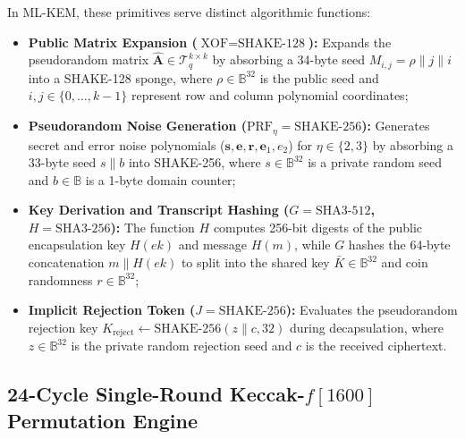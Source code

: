 In \mbox{ML-KEM}, these primitives serve distinct algorithmic functions:
\begin{itemize}
    \item \textbf{Public Matrix Expansion ($\text{XOF} = \text{SHAKE-128}$):} Expands the pseudorandom matrix $\hat{\mathbf{A}} \in \mathcal{T}_q^{k \times k}$ by absorbing a 34-byte seed $M_{i, j} = \rho \parallel j \parallel i$ into a SHAKE-128 sponge, where $\rho \in \mathbb{B}^{32}$ is the public seed and $i, j \in \{0, \dots, k-1\}$ represent row and column polynomial coordinates;
    \item \textbf{Pseudorandom Noise Generation ($\text{PRF}_\eta = \text{SHAKE-256}$):} Generates secret and error noise polynomials ($\mathbf{s}, \mathbf{e}, \mathbf{r}, \mathbf{e}_1, e_2$) for $\eta \in \{2, 3\}$ by absorbing a 33-byte seed $s \parallel b$ into SHAKE-256, where $s \in \mathbb{B}^{32}$ is a private random seed and $b \in \mathbb{B}$ is a 1-byte domain counter;
    \item \textbf{Key Derivation and Transcript Hashing ($G = \text{SHA3-512}$, $H = \text{SHA3-256}$):} The function $H$ computes 256-bit digests of the public encapsulation key $H(ek)$ and message $H(m)$, while $G$ hashes the 64-byte concatenation $m \parallel H(ek)$ to split into the shared key $\bar{K} \in \mathbb{B}^{32}$ and coin randomness $r \in \mathbb{B}^{32}$;
    \item \textbf{Implicit Rejection Token ($J = \text{SHAKE-256}$):} Evaluates the pseudorandom rejection key $K_{\text{reject}} \leftarrow \text{SHAKE-256}(z \parallel c, 32)$ during decapsulation, where $z \in \mathbb{B}^{32}$ is the private random rejection seed and $c$ is the received ciphertext.
\end{itemize}

\subsection{24-Cycle Single-Round Keccak-$f[1600]$ Permutation Engine}
\label{sec:keccak_core}


